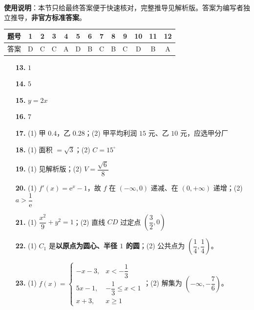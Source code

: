 
\begin{gknotice}
\textbf{使用说明}：本节只给最终答案便于快速核对，完整推导见解析版。答案为编写者独立推导，\textbf{非官方标准答案}。
\end{gknotice}

\begin{center}\begin{tabular}{ccccccccccccc}
\toprule
题号 & 1 & 2 & 3 & 4 & 5 & 6 & 7 & 8 & 9 & 10 & 11 & 12 \\
\midrule
答案 & D & C & C & A & D & B & C & B & C & D & B & A \\
\bottomrule
\end{tabular}\end{center}

\begin{itemize}[leftmargin=2.6em]
  \item[\textbf{13.}] $1$
  \item[\textbf{14.}] $5$
  \item[\textbf{15.}] $y=2x$
  \item[\textbf{16.}] $7$
\end{itemize}

\begin{itemize}[leftmargin=2.6em]
  \item[\textbf{17.}] (1) 甲 $0.4$，乙 $0.28$；(2) 甲平均利润 $15$ 元、乙 $10$ 元，应选甲分厂
  \item[\textbf{18.}] (1) 面积 $=\sqrt3$；(2) $C=15^\circ$
  \item[\textbf{19.}] (1) 见解析版；(2) $V=\dfrac{\sqrt6}8$
  \item[\textbf{20.}] (1) $f'(x)=\mathrm e^{x}-1$，故 $f$ 在 $(-\infty,0)$ 递减、在 $(0,+\infty)$ 递增；(2) $a>\dfrac1{\mathrm e}$
  \item[\textbf{21.}] (1) $\dfrac{x^{2}}9+y^{2}=1$；(2) 直线 $CD$ 过定点 $\left(\dfrac32,0\right)$
\end{itemize}

\begin{itemize}[leftmargin=2.6em]
  \item[\textbf{22.}] (1) $C_1$ 是\textbf{以原点为圆心、半径 $1$ 的圆}；(2) 公共点为 $\left(\dfrac14,\dfrac14\right)$。
  \item[\textbf{23.}] (1) $f(x)=\begin{cases}-x-3,&x<-\dfrac13\\ 5x-1,&-\dfrac13\le x<1\\ x+3,&x\ge1\end{cases}$；(2) 解集为 $\left(-\infty,-\dfrac76\right)$。
\end{itemize}
